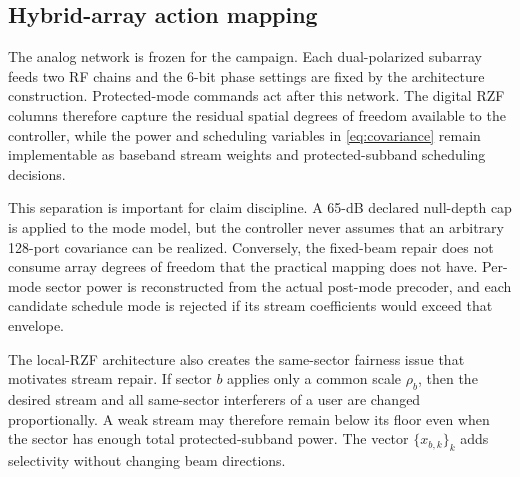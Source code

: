 \documentclass[journal]{IEEEtran}
\begin{document}
\subsection{Hybrid-array action mapping}
The analog network is frozen for the campaign. Each dual-polarized subarray feeds two RF chains and the 6-bit phase settings are fixed by the architecture construction. Protected-mode commands act after this network. The digital RZF columns therefore capture the residual spatial degrees of freedom available to the controller, while the power and scheduling variables in \eqref{eq:covariance} remain implementable as baseband stream weights and protected-subband scheduling decisions.

This separation is important for claim discipline. A 65-dB declared null-depth cap is applied to the mode model, but the controller never assumes that an arbitrary 128-port covariance can be realized. Conversely, the fixed-beam repair does not consume array degrees of freedom that the practical mapping does not have. Per-mode sector power is reconstructed from the actual post-mode precoder, and each candidate schedule mode is rejected if its stream coefficients would exceed that envelope.

The local-RZF architecture also creates the same-sector fairness issue that motivates stream repair. If sector $b$ applies only a common scale $\rho_b$, then the desired stream and all same-sector interferers of a user are changed proportionally. A weak stream may therefore remain below its floor even when the sector has enough total protected-subband power. The vector $\{x_{b,k}\}_k$ adds selectivity without changing beam directions.


\end{document}
